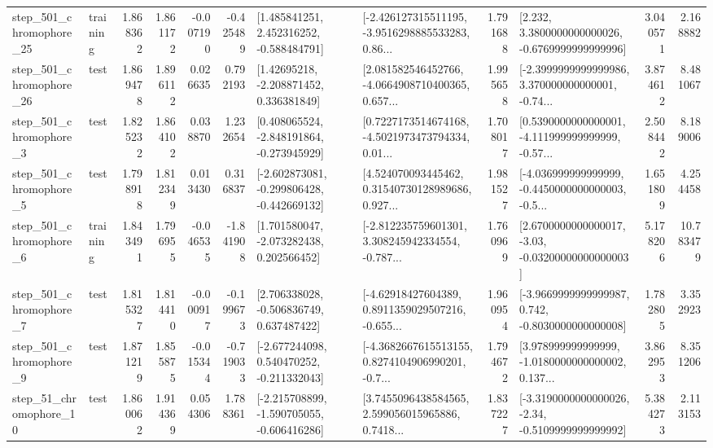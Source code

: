\begin{tabular}{llrrrrllrlrr}
  step\_501\_chromophore\_25 &  training &      1.868362 &    1.861172 &     -0.007190 & -0.425489 &    [1.485841251, 2.452316252, -0.588484791] &  [-2.426127315511195, -3.9516298885533283, 0.86... &       1.791688 &   [2.232, 3.3800000000000026, -0.6769999999999996] &            3.040571 &          2.168882 \\
  step\_501\_chromophore\_26 &      test &      1.869478 &    1.896112 &      0.026635 &  0.792193 &     [1.42695218, -2.208871452, 0.336381849] &  [2.081582546452766, -4.0664908710400365, 0.657... &       1.995658 &  [-2.3999999999999986, 3.370000000000001, -0.74... &            3.874612 &          8.481067 \\
   step\_501\_chromophore\_3 &      test &      1.825232 &    1.864102 &      0.038870 &  1.232654 &   [0.408065524, -2.848191864, -0.273945929] &  [0.7227173514674168, -4.5021973473794334, 0.01... &       1.708017 &  [0.5390000000000001, -4.111999999999999, -0.57... &            2.508442 &          8.189006 \\
   step\_501\_chromophore\_5 &      test &      1.798918 &    1.812349 &      0.013430 &  0.316837 &  [-2.602873081, -0.299806428, -0.442669132] &  [4.524070093445462, 0.31540730128989686, 0.927... &       1.981527 &  [-4.036999999999999, -0.4450000000000003, -0.5... &            1.651809 &          4.254458 \\
   step\_501\_chromophore\_6 &  training &      1.843491 &    1.796955 &     -0.046535 & -1.841908 &    [1.701580047, -2.073282438, 0.202566452] &  [-2.812235759601301, 3.308245942334554, -0.787... &       1.760969 &  [2.6700000000000017, -3.03, -0.03200000000000003] &            5.178206 &         10.783479 \\
   step\_501\_chromophore\_7 &      test &      1.815327 &    1.814410 &     -0.000917 & -0.199673 &    [2.706338028, -0.506836749, 0.637487422] &  [-4.62918427604389, 0.8911359029507216, -0.655... &       1.960954 &  [-3.9669999999999987, 0.742, -0.8030000000000008] &            1.782805 &          3.352923 \\
   step\_501\_chromophore\_9 &      test &      1.871219 &    1.855875 &     -0.015344 & -0.719033 &   [-2.677244098, 0.540470252, -0.211332043] &  [-4.3682667615513155, 0.8274104906990201, -0.7... &       1.794672 &  [3.978999999999999, -1.0180000000000002, 0.137... &            3.862953 &          8.351206 \\
   step\_51\_chromophore\_10 &      test &      1.860062 &    1.914369 &      0.054306 &  1.788361 &  [-2.215708899, -1.590705055, -0.606416286] &  [3.7455096438584565, 2.599056015965886, 0.7418... &       1.837227 &  [-3.3190000000000026, -2.34, -0.5109999999999992] &            5.384273 &          2.113153 \\

\end{tabular}

